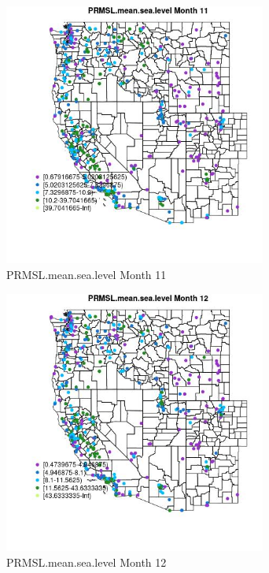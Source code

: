 \begin{figure} 
\centering  
\includegraphics[width=0.77\textwidth]{Code_Outputs/ML_input_report_ML_input_PM25_Step5_part_d_de_duplicated_aves_ML_input_MapObsMo11PRMSLmeansealevel.jpg} 
\caption{\label{fig:ML_input_report_ML_input_PM25_Step5_part_d_de_duplicated_aves_ML_inputMapObsMo11PRMSLmeansealevel}PRMSL.mean.sea.level Month 11} 
\end{figure} 
 

\clearpage 

\begin{figure} 
\centering  
\includegraphics[width=0.77\textwidth]{Code_Outputs/ML_input_report_ML_input_PM25_Step5_part_d_de_duplicated_aves_ML_input_MapObsMo12PRMSLmeansealevel.jpg} 
\caption{\label{fig:ML_input_report_ML_input_PM25_Step5_part_d_de_duplicated_aves_ML_inputMapObsMo12PRMSLmeansealevel}PRMSL.mean.sea.level Month 12} 
\end{figure} 
 

